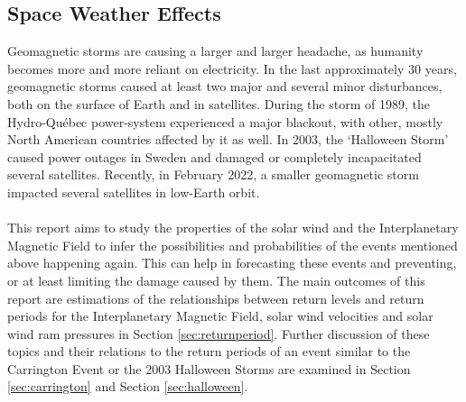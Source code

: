 \documentclass[12pt]{article}
\begin{document}
    \subsection{Space Weather Effects}\label{sec:spaceweather}
        Geomagnetic storms are causing a larger and larger headache, as humanity becomes more and more reliant on electricity. In the last approximately 30 years, geomagnetic storms caused at least two major and several minor disturbances, both on the surface of Earth and in satellites. During the storm of 1989, the Hydro-Québec power-system experienced a major blackout, with other, mostly North American countries affected by it as well\cite{1989hydroquebec}. In 2003, the `Halloween Storm' \cite{2003halloweensweden} caused power outages in Sweden and damaged or completely incapacitated several satellites. Recently, in February 2022, a smaller geomagnetic storm impacted several satellites in low-Earth orbit\cite{2022spacex}.\\ \\
        This report aims to study the properties of the solar wind and the Interplanetary Magnetic Field to infer the possibilities and probabilities of the events mentioned above happening again. This can help in forecasting these events and preventing, or at least limiting the damage caused by them. The main outcomes of this report are estimations of the relationships between return levels and return periods for the Interplanetary Magnetic Field, solar wind velocities and solar wind ram pressures in Section \ref{sec:returnperiod}. Further discussion of these topics and their relations to the return periods of an event similar to the Carrington Event or the 2003 Halloween Storms are examined in Section \ref{sec:carrington} and Section \ref{sec:halloween}.
\end{document}
